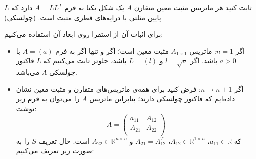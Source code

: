 
ثابت کنید هر ماتریس مثبت معین متقارن $A$ یک شکل یکتا به فرم $A = LL^T$ دارد که $L$ پایین مثلثی با درایه‌های قطری مثبت است. (چولسکی)

برای اثبات آن از استقرا روی ابعاد آن استفاده می‌کنیم:
\begin{itemize}
	\item اگر $n = 1$: 
	ماتریس
	 $A_{1 \times 1}$ مثبت معین است؛ اگر و تنها اگر به فرم 
	 $A = (a)$ با $a > 0$  باشد. 
	 اگر $l = \sqrt{a}$ و $L = (l)$ باشد، جلوتر ثابت می‌کنیم که $L$ فاکتور چولسکی $A$ می‌باشد.
	 \item
	 اگر 
	 $n \rightarrow n + 1$:
	 فرض کنید برای همه‌ی ماتریس‌های متقارن و مثبت معین نشان داده‌ایم که فاکتور چولسکی دارند؛ بنابراین ماتریس $A$ را می‌توان به فرم زیر نوشت:
	 $$A = 
	 \begin{pmatrix}
	 a_{11} & A_{12}\\
	 A_{21} & A_{22}\\
	 \end{pmatrix}$$
	  که
	 $a_{11} \in \mathbb{R}$، 
	 $A_{12} \in \mathbb{R}^{1\times n}$،
	 $A_{21} = A_{12}^T$ و 
	 $A_{22} \in \mathbb{R}^{n \times n}$ است. حال تعریف $S$ را به صورت زیر تعریف می‌کنیم:
	 

\end{itemize}
